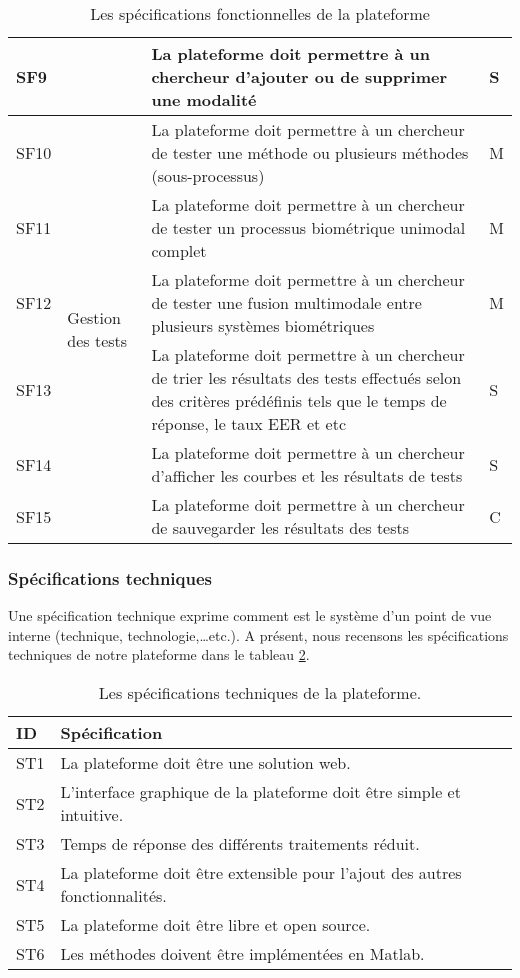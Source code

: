 \begin{table}[H]
\begin{tabular}{|l|l|p{10cm}|l|}
		SF9 & & La plateforme doit permettre à un chercheur d'ajouter ou de supprimer une modalité & S \\ \hline
		SF10 & \multirow{6}{*}{Gestion des tests} & La plateforme doit permettre à un chercheur de tester une méthode ou plusieurs méthodes (sous-processus) & M \\ \cline{1-1} \cline{3-4} 
		SF11 & & La plateforme doit permettre à un chercheur de tester un processus biométrique unimodal complet & M \\ \cline{1-1} \cline{3-4} 
		SF12 & & La plateforme doit permettre à un chercheur de tester une fusion multimodale entre plusieurs systèmes biométriques & M \\ \cline{1-1} \cline{3-4} 
		SF13 & & La plateforme doit permettre à un chercheur de trier les résultats des tests effectués selon des critères prédéfinis tels que le temps de réponse, le taux EER et etc & S \\ \cline{1-1} \cline{3-4} 
		SF14 & & La plateforme doit permettre à un chercheur d'afficher les courbes et les résultats de tests & S \\ \cline{1-1} \cline{3-4} 
		SF15 & & La plateforme doit permettre à un chercheur de sauvegarder les résultats des tests & C \\ \hline

	\end{tabular}
	\caption{Les spécifications fonctionnelles de la plateforme}
	\label{specifFonct}
\end{table}



\subsubsection{Spécifications techniques}
Une spécification technique exprime comment est le
système d’un point de vue interne (technique,
technologie,…etc.). A présent, nous recensons les spécifications techniques de notre plateforme dans le tableau \ref{specifnonFonct}. 
\begin{table}[H]
	\centering
	\caption{Les spécifications techniques de la plateforme.}
	\label{specifnonFonct}
	\begin{tabular}{|l | p{14.5cm}| }
		\hline	ID & Spécification  \\\hline           
		ST1	&La plateforme doit être une solution web. \\ \hline
		ST2	&L’interface graphique de la plateforme doit être simple et intuitive. \\ \hline
		ST3	&Temps de réponse des différents traitements réduit. \\ \hline
		ST4	&La plateforme doit être extensible pour l'ajout des autres fonctionnalités. \\ \hline
		ST5	&La plateforme doit être libre et open source. \\ \hline
		ST6	&Les méthodes doivent être implémentées en Matlab. \\ \hline
	\end{tabular}
	
\end{table}

